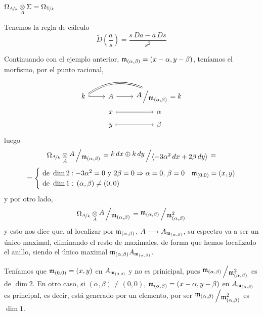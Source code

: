 \begin{cor}
          $\Omega_{\nicefrac{A}{k}} \underset{A}{\otimes} \Sigma = \Omega_{\nicefrac{\Sigma}{k}}$
\end{cor}
\begin{obs}
    Tenemos la regla de c\'alculo 
    $$\tilde D\left( \frac{a}{s} \right)  = \frac{s \, Da - a \, Ds}{s^2}$$
\end{obs}
\begin{ejem}
    Continuando con el ejemplo anterior, $\mathfrak{m}_{(\alpha, \beta)} = (x-\alpha, y-\beta)$, ten\'iamos el morfismo, por el punto racional, 
    $$\bt k \arrow[bend left=10mm, equal]{rr} \rar[hook] & A \rar & \modulo{A}{\m_{(\alpha, \beta)}} = k\\[-5mm] & x \rarmaps & \alpha \\[-5mm] & y \rarmaps & \beta \et$$
    luego 
    $$\Omega_{\nicefrac{A}{k}} \underset{A}{\otimes} \modulo{A}{\m_{(\alpha, \beta)}} = \modulo{k \, dx \oplus k \, dy}{\langle -3\alpha^2 \, dx +2\beta\,  dy \rangle} =$$
    $$=\begin{cases}
        \text{ de } \dim 2: -3\alpha^2 = 0 \text{ y } 2 \beta =0 \Rightarrow \alpha=0, \, \beta =0 & \mathfrak{m}_{(0,0)} = (x,y) \\  \text{ de } \dim 1:\,  (\alpha, \beta) \neq (0,0)
    \end{cases} $$
    y por otro lado, 
    $$\Omega_{\nicefrac{A}{k}} \underset{A}{\otimes} \modulo{A}{\m_{(\alpha, \beta)}} = \modulo{\m_{(\alpha, \beta)}}{\m^2_{(\alpha, \beta)}}$$ y esto nos dice que, al localizar por $\mathfrak{m}_{(\alpha, \beta)}$, $A \longrightarrow A_{\mathfrak{m}_{(\alpha, \beta)}}$, su espectro va a ser un \'unico maximal, eliminando el resto de maximales, de forma que hemos localizado el anillo, siendo el \'unico maximal $\mathfrak{m}_{(\alpha, \beta)} A_{\mathfrak{m}_{(\alpha, \beta)}}$. 

    Ten\'iamos que $\mathfrak{m}_{(0,0)} = (x,y)$ en $A_{\mathfrak{m}_{(0,0)}}$ y no es prinicipal, pues $\modulo{\m_{(\alpha, \beta)}}{\m^2_{(\alpha, \beta)}}$ es de $\dim 2$. En otro caso, si $(\alpha, \beta)\neq(0,0)$, $\mathfrak{m}_{(\alpha, \beta)} = (x-\alpha, y-\beta)$ en $A_{\mathfrak{m}_{(\alpha, \beta)}}$ es principal, es decir, est\'a generado por un elemento, por ser $\modulo{\m_{(\alpha, \beta)}}{\m^2_{(\alpha, \beta)}}$ es $\dim 1$. 
\end{ejem}
